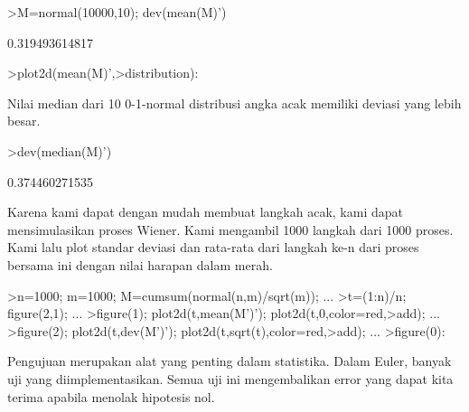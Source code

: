 \documentclass[a4paper,10pt]{article}
\begin{document}
\begin{eulernotebook}
\begin{eulercomment}
\end{eulercomment}
\begin{eulerprompt}
>M=normal(10000,10); dev(mean(M)')
\end{eulerprompt}
\begin{euleroutput}
  0.319493614817
\end{euleroutput}
\begin{eulerprompt}
>plot2d(mean(M)',>distribution):
\end{eulerprompt}
\begin{eulercomment}
Nilai median dari 10 0-1-normal distribusi angka acak memiliki deviasi
yang lebih besar.
\end{eulercomment}
\begin{eulerprompt}
>dev(median(M)')
\end{eulerprompt}
\begin{euleroutput}
  0.374460271535
\end{euleroutput}
\begin{eulercomment}
Karena kami dapat dengan mudah membuat langkah acak, kami dapat
mensimulasikan proses Wiener. Kami mengambil 1000 langkah dari 1000
proses. Kami lalu plot standar deviasi dan rata-rata dari langkah ke-n
dari proses bersama ini dengan nilai harapan dalam merah.
\end{eulercomment}
\begin{eulerprompt}
>n=1000; m=1000; M=cumsum(normal(n,m)/sqrt(m)); ...
>t=(1:n)/n; figure(2,1); ...
>figure(1); plot2d(t,mean(M')'); plot2d(t,0,color=red,>add); ...
>figure(2); plot2d(t,dev(M')'); plot2d(t,sqrt(t),color=red,>add); ...
>figure(0):
\end{eulerprompt}
\begin{eulercomment}
Pengujuan merupakan alat yang penting dalam statistika. Dalam Euler,
banyak uji yang diimplementasikan. Semua uji ini mengembalikan error
yang dapat kita terima apabila menolak hipotesis nol.


\end{eulercomment}
\end{eulernotebook}
\end{document}
